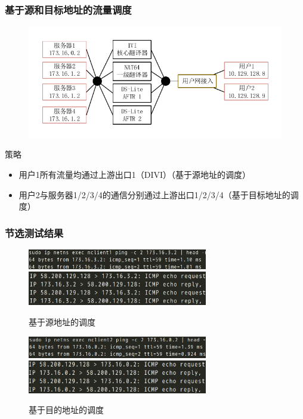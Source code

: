 \documentclass{beamer}
\begin{document}
\begin{frame}
  \frametitle{基于源和目标地址的流量调度}
  \vspace{-1em}
  \begin{figure}
    \includegraphics[width=\textwidth]{figs/12-test-arch.pdf}
  \end{figure}
  \vspace{-2em}

  \begin{block}{策略}
    \begin{itemize}
    \item 用户1所有流量均通过上游出口1（DIVI）（基于源地址的调度）
    \item 用户2与服务器1/2/3/4的通信分别通过上游出口1/2/3/4（基于目标地址的调度）
    \end{itemize}
  \end{block}
\end{frame}

\begin{frame}
  \frametitle{节选测试结果}

  \begin{figure}
    \includegraphics[width=0.7\textwidth]{figs/c1-s4-ping.jpeg}\\
    \includegraphics[width=0.7\textwidth]{figs/c1-s4-pdump.jpeg}
    \caption{\tiny 基于源地址的调度}
  \end{figure}

  \vspace{-1em}

  \begin{figure}
    \includegraphics[width=0.7\textwidth]{figs/c2-s1-ping.jpeg}\\
    \includegraphics[width=0.7\textwidth]{figs/c2-s1-pdump.jpeg}
    \caption{\tiny 基于目的地址的调度}
  \end{figure}
\end{frame}
\end{document}
